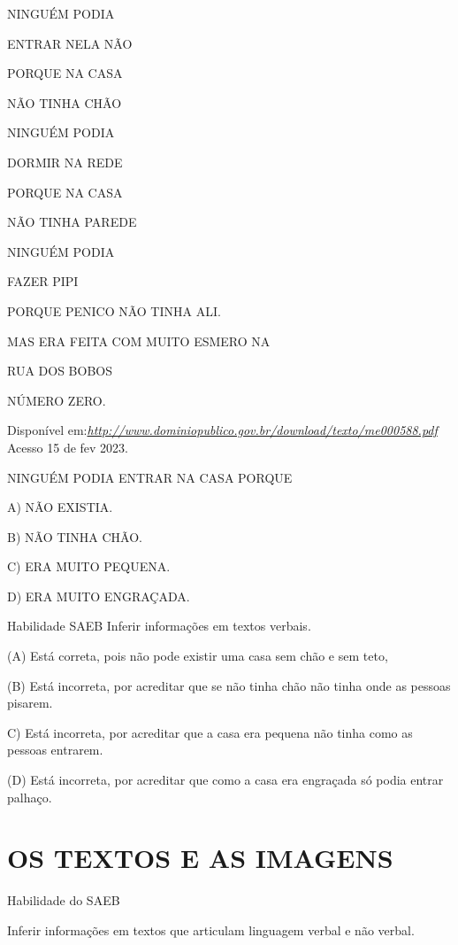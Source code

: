 \begin{escola}
NINGUÉM PODIA

ENTRAR NELA NÃO

PORQUE NA CASA

NÃO TINHA CHÃO

NINGUÉM PODIA

DORMIR NA REDE

PORQUE NA CASA

NÃO TINHA PAREDE

NINGUÉM PODIA

FAZER PIPI

PORQUE PENICO NÃO TINHA ALI.

MAS ERA FEITA COM MUITO ESMERO NA

RUA DOS BOBOS

NÚMERO ZERO.

Disponível
em:\href{http://www.dominiopublico.gov.br/download/texto/me000588.pdf}{\emph{http://www.dominiopublico.gov.br/download/texto/me000588.pdf}}
Acesso 15 de fev 2023.

NINGUÉM PODIA ENTRAR NA CASA PORQUE

A) NÃO EXISTIA.

B) NÃO TINHA CHÃO.

C) ERA MUITO PEQUENA.

D) ERA MUITO ENGRAÇADA.

\protect\hypertarget{_heading=h.2p2csry}{}{}Habilidade SAEB Inferir
informações em textos verbais.

(A) Está correta, pois não pode existir uma casa sem chão e sem teto,

(B) Está incorreta, por acreditar que se não tinha chão não tinha onde
as pessoas pisarem.

C) Está incorreta, por acreditar que a casa era pequena não tinha como
as pessoas entrarem.

(D) Está incorreta, por acreditar que como a casa era engraçada só podia
entrar palhaço.

\chapter{OS TEXTOS E AS IMAGENS}

\protect\hypertarget{_heading=h.3c1jaqhv8nr}{}{}

\protect\hypertarget{_heading=h.kyrxefm3laa1}{}{}Habilidade do SAEB

\protect\hypertarget{_heading=h.er3p7jk5yewm}{}{}Inferir informações em textos que articulam linguagem verbal e não verbal.


\end{escola}
